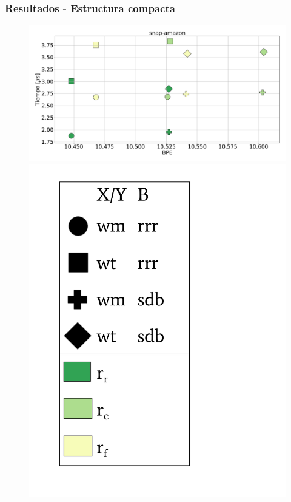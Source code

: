 \begin{frame}
\frametitle{Resultados - Estructura compacta}

\begin{figure}
	\centering
	
    	\begin{minipage}{1\textwidth}
    		\centering
    		\begin{minipage}{0.8\textwidth}
    			\centering
    			\includegraphics[width=1\linewidth]{../img/sdsl/secuencialBig/snap-amazon.pdf}
    		\end{minipage}
    		\begin{minipage}{0.15\textwidth}
    			\centering
    			\includegraphics[scale=.15, clip, trim=70 0 0 0]{../img/sdsl/label.pdf}
    		\end{minipage}	
    	\end{minipage}


\end{figure}
\end{frame}
